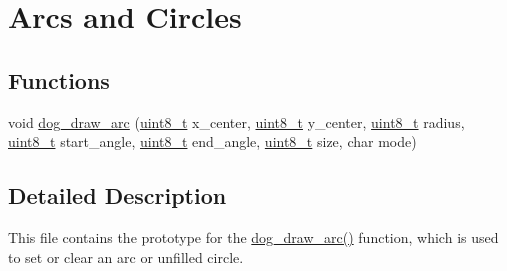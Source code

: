 \hypertarget{group___d_o_g_m128__arc}{\section{Arcs and Circles}
\label{group___d_o_g_m128__arc}
}
\subsection*{Functions}
\begin{DoxyCompactItemize}
\item 
void \hyperlink{group___d_o_g_m128__arc_gabf8940f51fd82da99100b41d73bd2ddd}{dog\-\_\-draw\-\_\-arc} (\hyperlink{group___d_o_g_m128__common_gaba7bc1797add20fe3efdf37ced1182c5}{uint8\-\_\-t} x\-\_\-center, \hyperlink{group___d_o_g_m128__common_gaba7bc1797add20fe3efdf37ced1182c5}{uint8\-\_\-t} y\-\_\-center, \hyperlink{group___d_o_g_m128__common_gaba7bc1797add20fe3efdf37ced1182c5}{uint8\-\_\-t} radius, \hyperlink{group___d_o_g_m128__common_gaba7bc1797add20fe3efdf37ced1182c5}{uint8\-\_\-t} start\-\_\-angle, \hyperlink{group___d_o_g_m128__common_gaba7bc1797add20fe3efdf37ced1182c5}{uint8\-\_\-t} end\-\_\-angle, \hyperlink{group___d_o_g_m128__common_gaba7bc1797add20fe3efdf37ced1182c5}{uint8\-\_\-t} size, char mode)
\end{DoxyCompactItemize}


\subsection{Detailed Description}
This file contains the prototype for the \hyperlink{group___d_o_g_m128__arc_gabf8940f51fd82da99100b41d73bd2ddd}{dog\-\_\-draw\-\_\-arc()} function, which is used to set or clear an arc or unfilled circle. 


